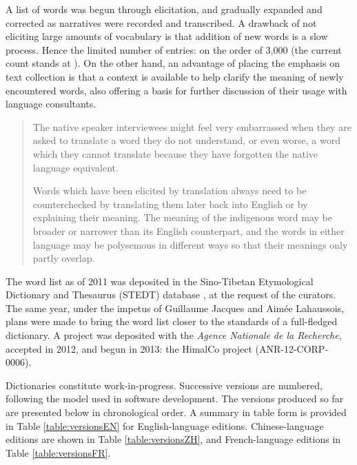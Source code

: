 A list of words was begun through elicitation, and gradually expanded and corrected as narratives were recorded and transcribed. A drawback of not eliciting large amounts of vocabulary is that addition of new words is a slow process. Hence the limited number of entries: on the order of 3,000 (the current count stands at ). On the other hand, an advantage of placing the emphasis on text collection is that a context is available to help clarify the meaning of newly encountered words, also offering a basis for further discussion of their usage with language consultants.

\begin{quotation}
    The native speaker interviewees might feel very embarrassed when they are asked to translate a word they do not understand, or even worse, a word which they cannot translate because they have forgotten the native language equivalent.

Words which have been elicited by translation always need to be counterchecked by translating them later back into English or by explaining their meaning. The meaning of the indigenous word may be broader or narrower than its English counterpart, and the words in either language may be polysemous in different ways so that their meanings only partly overlap. \parencite[44]{mosel_dictionary_2004}
\end{quotation}

The word list as of 2011 was deposited in the Sino-Tibetan Etymological Dictionary and Thesaurus (STEDT) database \parencite{stedt}, at the request of the curators. The same year, under the impetus of Guillaume Jacques and Aimée Lahaussois, plans were made to bring the word list closer to the standards of a full-fledged dictionary. A project was deposited with the \emph{Agence Nationale de la Recherche}, accepted in 2012, and begun in 2013: the HimalCo project (ANR-12-CORP-0006).

Dictionaries constitute work-in-progress. Successive versions are numbered, following the model used in software development. %
The versions produced so far are presented below in chronological order. A summary in table form is provided in Table \ref{table:versionsEN} for English-language editions. Chinese-language editions are shown in Table \ref{table:versionsZH}, and French-language editions in Table \ref{table:versionsFR}.


